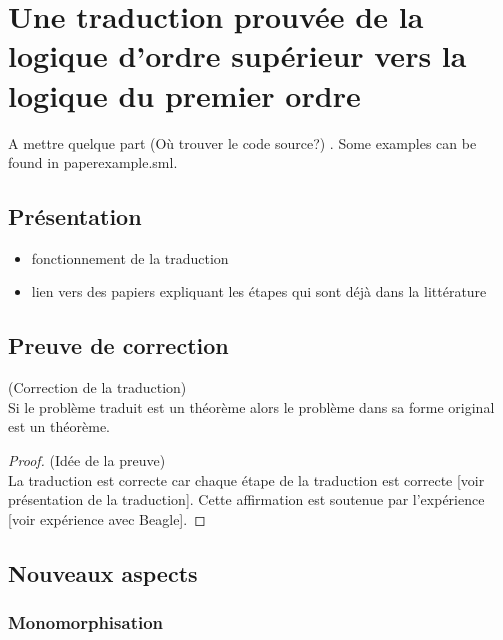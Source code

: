 \section{Une traduction prouvée de la logique d'ordre supérieur vers la
  logique du premier ordre}
 
A mettre quelque part (Où trouver le code source?)
. Some examples can be found in paperexample.sml.

\subsection{Présentation}

\begin{itemize}
\item fonctionnement de la traduction
\item lien vers des papiers expliquant les étapes qui sont déjà dans la
  littérature
\end{itemize}

\subsection{Preuve de correction}

\begin{thm}(Correction de la traduction)
\\Si le problème traduit est un théorème alors le problème dans sa forme original est un théorème.
\end{thm}

\begin{proof}(Idée de la preuve)
\\La traduction est correcte car chaque étape de la traduction est correcte [voir présentation de la traduction]. Cette affirmation est soutenue par l'expérience [voir expérience avec Beagle].
\end{proof}

\subsection{Nouveaux aspects}
\label{sec:traduction:nouveautes}

\subsubsection{Monomorphisation}


